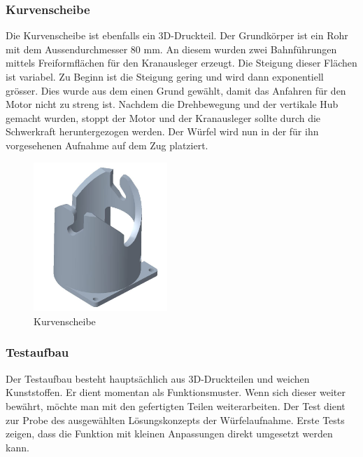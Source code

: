 \documentclass[../../main.tex]{subfiles}
\begin{document}
        \subsubsection{Kurvenscheibe}
        Die Kurvenscheibe ist ebenfalls ein 3D-Druckteil. Der Grundkörper ist ein Rohr mit dem Aussendurchmesser 80 mm. An diesem wurden zwei Bahnführungen mittels Freiformflächen für den Kranausleger erzeugt. Die Steigung dieser Flächen ist variabel. Zu Beginn ist die Steigung gering und wird dann exponentiell grösser. Dies wurde aus dem einen Grund gewählt, damit das Anfahren für den Motor nicht zu streng ist. Nachdem die Drehbewegung und der vertikale Hub gemacht wurden, stoppt der Motor und der Kranausleger sollte durch die Schwerkraft heruntergezogen werden. Der Würfel wird nun in der für ihn vorgesehenen Aufnahme auf dem Zug platziert.\\


        \begin{figure}[H]
            \centering
            \includegraphics[width=0.45\textwidth]{Kurvenscheibe.JPG}
            \caption {Kurvenscheibe}
        \end{figure}
    

        \subsubsection{Testaufbau}
        Der Testaufbau besteht hauptsächlich aus 3D-Druckteilen und weichen Kunststoffen. Er dient momentan als Funktionsmuster. Wenn sich dieser weiter bewährt, möchte man mit den gefertigten Teilen weiterarbeiten. Der Test dient zur Probe des ausgewählten Lösungskonzepts der Würfelaufnahme. Erste Tests zeigen, dass die Funktion mit kleinen Anpassungen direkt umgesetzt werden kann.
\end{document}
